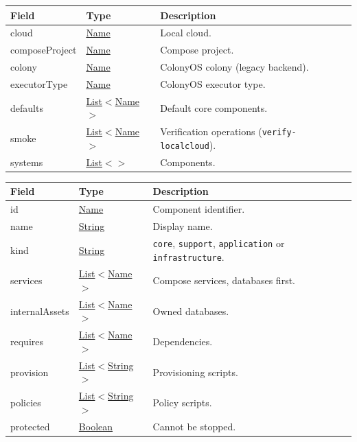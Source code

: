 \documentclass[a4paper]{arrowhead}
\newcommand{\mref}[2][]{{\textcolor{ArrowheadPurple}{\hyperref[sec:model:#2]{\ifstrempty{#1}{#2}{#1}}}}}
\newcommand{\pref}[1]{{\textcolor{ArrowheadGrey}{\hyperref[sec:model:primitives:#1]{#1}}}}
\begin{document}

\noindent\begin{tabularx}{\textwidth}{| >{\raggedright\arraybackslash}p{3.6cm} | >{\raggedright\arraybackslash\small}p{4.4cm} | X |} \hline
\rowcolor{gray!33} Field & Type & Description \\ \hline
cloud & \pref{Name} & Local cloud. \\ \hline
composeProject & \pref{Name} & Compose project. \\ \hline
colony & \pref{Name} & ColonyOS colony (legacy backend). \\ \hline
executorType & \pref{Name} & ColonyOS executor type. \\ \hline
defaults & \pref{List}$<$\pref{Name}$>$ & Default core components. \\ \hline
smoke & \pref{List}$<$\pref{Name}$>$ & Verification operations (\texttt{verify-localcloud}). \\ \hline
systems & \pref{List}$<$\mref{Component}$>$ & Components. \\ \hline
\end{tabularx}


\noindent\begin{tabularx}{\textwidth}{| >{\raggedright\arraybackslash}p{3.6cm} | >{\raggedright\arraybackslash\small}p{4.4cm} | X |} \hline
\rowcolor{gray!33} Field & Type & Description \\ \hline
id & \pref{Name} & Component identifier. \\ \hline
name & \pref{String} & Display name. \\ \hline
kind & \pref{String} & \texttt{core}, \texttt{support}, \texttt{application} or \texttt{infrastructure}. \\ \hline
services & \pref{List}$<$\pref{Name}$>$ & Compose services, databases first. \\ \hline
internalAssets & \pref{List}$<$\pref{Name}$>$ & Owned databases. \\ \hline
requires & \pref{List}$<$\pref{Name}$>$ & Dependencies. \\ \hline
provision & \pref{List}$<$\pref{String}$>$ & Provisioning scripts. \\ \hline
policies & \pref{List}$<$\pref{String}$>$ & Policy scripts. \\ \hline
protected & \pref{Boolean} & Cannot be stopped. \\ \hline
\end{tabularx}
\end{document}
